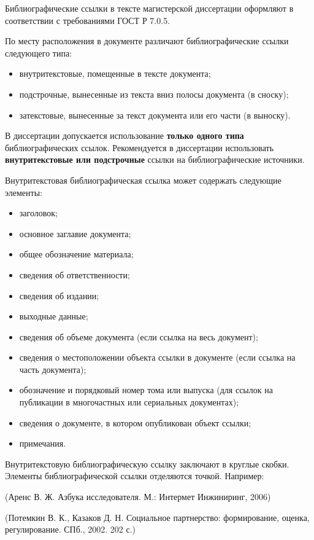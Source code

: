 \documentclass[12pt,a4paper, oneside]{extreport}
\begin{document}
Библиографические ссылки в тексте магистерской диссертации оформляют в соответствии с требованиями ГОСТ Р 7.0.5.

По месту расположения в документе различают библиографические ссылки  следующего типа:
\begin{itemize}
\item внутритекстовые, помещенные в тексте документа;
\item подстрочные, вынесенные из текста вниз полосы документа (в сноску);
\item затекстовые, вынесенные за текст документа или его части (в выноску).
\end{itemize}

В диссертации допускается использование \textbf{только одного типа} библиографических ссылок. Рекомендуется в диссертации  использовать  \textbf{внутритекстовые или подстрочные} ссылки на библиографические источники.

Внутритекстовая библиографическая ссылка может содержать следующие элементы:
\begin{itemize}
\item заголовок;
\item основное заглавие документа;
\item общее обозначение материала;
\item сведения об ответственности;
\item сведения об издании;
\item выходные данные;
\item сведения об объеме документа (если ссылка на весь документ);
\item сведения о местоположении объекта ссылки в документе (если ссылка на часть документа);
\item обозначение и порядковый номер тома или выпуска (для ссылок на публикации в многочастных или сериальных документах);
\item сведения о документе, в котором опубликован объект ссылки;
\item примечания.
\end{itemize}

Внутритекстовую библиографическую ссылку заключают в круглые скобки. Элементы
библиографической ссылки отделяются точкой. Например:

(Аренс В. Ж. Азбука исследователя. М.: Интермет Инжиниринг, 2006)

(Потемкин В. К., Казаков Д. Н. Социальное партнерство: формирование, оценка, регулирование. СПб., 2002. 202 с.)
\end{document}
